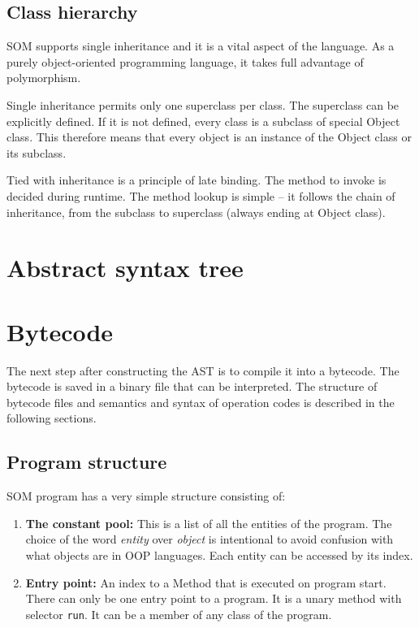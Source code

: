 \documentclass[thesis=M,english]{FITthesis}[2019/12/23]
\begin{document}
\subsection{Class hierarchy}
SOM supports single inheritance and it is a vital aspect of the language. As a purely object-oriented programming language,
it takes full advantage of polymorphism.

Single inheritance permits only one superclass per class. The superclass can be explicitly defined. If it is not defined,
every class is a subclass of special Object class. This therefore means that every object is an instance of the Object class
or its subclass.

Tied with inheritance is a principle of late binding. The method to invoke is decided during runtime. The method lookup is simple
-- it follows the chain of inheritance, from the subclass to superclass (always ending at Object class). 

\section{Abstract syntax tree}

\section{Bytecode}
The next step after constructing the AST is to compile it into a bytecode. The bytecode is saved in a binary file that can be
interpreted. The structure of bytecode files and semantics and syntax of operation codes is described in the following sections.

\subsection{Program structure}
SOM program has a very simple structure consisting of:
\begin{enumerate}
	\item \textbf{The constant pool:} This is a list of all the entities of the program. The choice of the word \textit{entity}
		over \textit{object} is intentional to avoid confusion with what objects are in OOP languages. Each entity can be accessed
		by its index.
	\item \textbf{Entry point: } An index to a Method that is executed on program start. There can only be one entry point to a
		program. It is a unary method with selector \texttt{run}. It can be a member of any class of the program.  
\end{enumerate}
\end{document}
